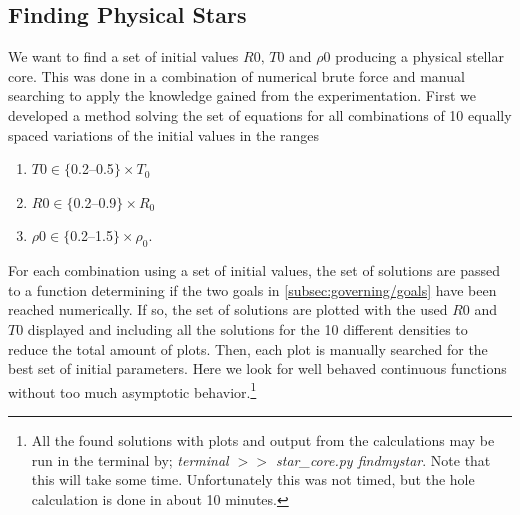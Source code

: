 \documentclass[11pt,a4paper,twocolumn,titlepage]{article}
\begin{document}
\subsection{Finding Physical Stars} \label{subsec:Method/Find_star}
We want to find a set of initial values ${R0,\,T0}$ and $\rho0$ producing a physical stellar core. This was done in a combination of numerical brute force and manual searching to apply the knowledge gained from the experimentation. First we developed a method solving the set of equations for all combinations of 10 equally spaced variations of the initial values in the ranges
\begin{enumerate}[\textbullet]
\item $T0 \in \{$\numrange{0.2}{0.5}$\} \times T_0$

\item $R0 \in \{$\numrange{0.2}{0.9}$\} \times R_0$

\item $\rho0 \in \{$\numrange{0.2}{1.5}$\} \times \rho_0$.
\end{enumerate}
For each combination using a set of initial values, the set of solutions are passed to a function determining if the two goals in \cref{subsec:governing/goals} have been reached numerically. If so, the set of solutions are plotted with the used $R0$ and $T0$ displayed and including all the solutions for the 10 different densities to reduce the total amount of plots. Then, each plot is manually searched for the best set of initial parameters. Here we look for well behaved continuous functions without too much asymptotic behavior.\footnote{All the found solutions with plots and output from the calculations may be run in the terminal by;  \textit{terminal $>>$ {star\_core.py} findmystar}. Note that this will take some time. Unfortunately this was not timed, but the hole calculation is done in about 10 minutes.}
\end{document}
